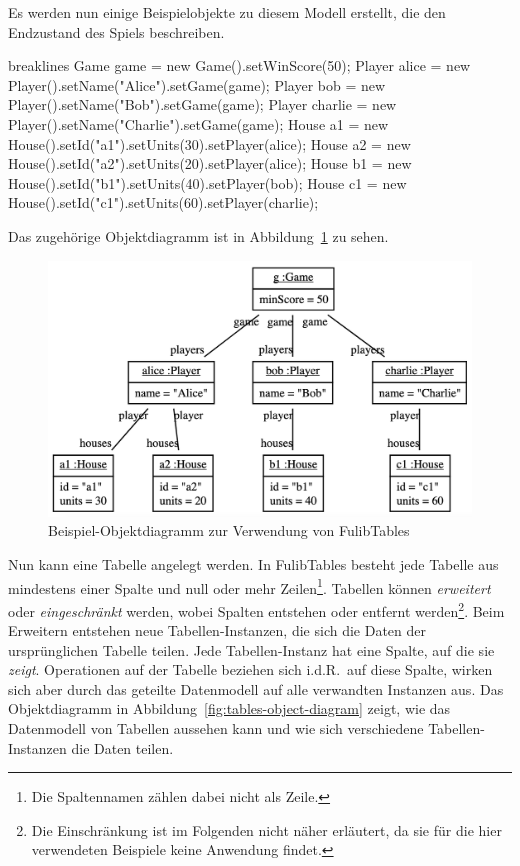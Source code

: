 Es werden nun einige Beispielobjekte zu diesem Modell erstellt, die den Endzustand des Spiels beschreiben.

\begin{jcodeblock*}{breaklines}
    Game game = new Game().setWinScore(50);
    Player alice = new Player().setName("Alice").setGame(game);
    Player bob = new Player().setName("Bob").setGame(game);
    Player charlie = new Player().setName("Charlie").setGame(game);
    House a1 = new House().setId("a1").setUnits(30).setPlayer(alice);
    House a2 = new House().setId("a2").setUnits(20).setPlayer(alice);
    House b1 = new House().setId("b1").setUnits(40).setPlayer(bob);
    House c1 = new House().setId("c1").setUnits(60).setPlayer(charlie);
\end{jcodeblock*}

Das zugehörige Objektdiagramm ist in Abbildung~\ref{fig:game-object-diagram} zu sehen.

\begin{figure}
    \includegraphics[width=\textwidth]{chapter/pattern-matching/img/game-object-diagram.png}
    \caption{Beispiel-Objektdiagramm zur Verwendung von FulibTables}
    \label{fig:game-object-diagram}
\end{figure}

Nun kann eine Tabelle angelegt werden.
In FulibTables besteht jede Tabelle aus mindestens einer Spalte und null oder mehr Zeilen\footnote{Die Spaltennamen zählen dabei nicht als Zeile.}.
Tabellen können \emph{erweitert} oder \emph{eingeschränkt} werden, wobei Spalten entstehen oder entfernt werden\footnote{Die Einschränkung ist im Folgenden nicht näher erläutert, da sie für die hier verwendeten Beispiele keine Anwendung findet.}.
Beim Erweitern entstehen neue Tabellen-Instanzen, die sich die Daten der ursprünglichen Tabelle teilen.
Jede Tabellen-Instanz hat eine Spalte, auf die sie \emph{zeigt}.
Operationen auf der Tabelle beziehen sich i.d.R.\ auf diese Spalte, wirken sich aber durch das geteilte Datenmodell auf alle verwandten Instanzen aus.
Das Objektdiagramm in Abbildung~\ref{fig:tables-object-diagram} zeigt, wie das Datenmodell von Tabellen aussehen kann und wie sich verschiedene Tabellen-Instanzen die Daten teilen.

